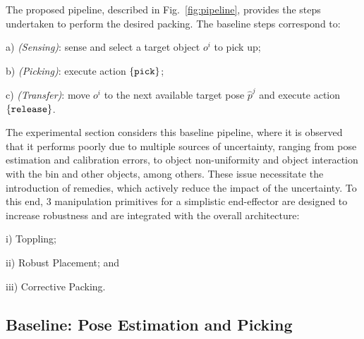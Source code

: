 The proposed pipeline, described in Fig.~\ref{fig:pipeline}, provides the steps undertaken to perform the desired packing. The baseline steps correspond to: 
\begin{myitem}
\item[a)] {\em (Sensing)}: sense and select a target object $o^i$ to pick up;
\item[b)] {\em (Picking)}: execute action $\{\tt pick\}$; 
\item[c)] {\em (Transfer)}: move $o^i$ to the next available target pose $\hat{p}^j$ and execute action $\{\tt release\}$.
\end{myitem}
The experimental section considers this baseline pipeline, where it is observed that it performs poorly due to multiple sources of uncertainty, ranging from pose estimation and calibration errors, to object non-uniformity and object interaction with the bin and other objects, among others. These issue necessitate the introduction of remedies, which actively reduce the impact of the uncertainty. To this end, 3 manipulation primitives for a simplistic end-effector are designed to increase robustness and are integrated with the overall architecture: 
\begin{myitem}
\item[i)] Toppling;
\item[ii)] Robust Placement; and 
\item[iii)] Corrective Packing.
\end{myitem}



\subsection{Baseline: Pose Estimation and Picking}


